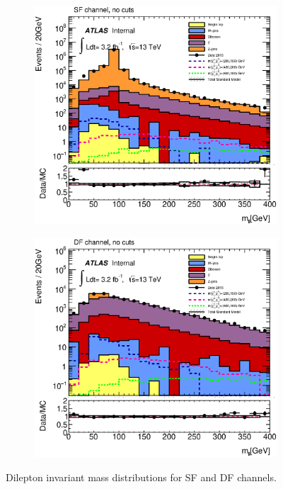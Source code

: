 \begin{figure}[!th]	   
	\begin{subfigure}[t]{0.5\textwidth}
		\subcaption{} 
		\label{fig:SF_total_mll}
        \includegraphics[scale=0.35]{Chap4/SF_DileptonMll_13TeV_total_signal} 
        \end{subfigure} 
     \begin{subfigure}[t]{0.5\textwidth}
     \subcaption{}
     	\label{fig:DF_total_mll}
        \includegraphics[scale=0.35]{Chap4/Emu_DileptonMll_13TeV_total_signal} 
        \end{subfigure}
\caption{Dilepton invariant mass distributions for SF and DF channels.}	
        \label{fig:Elmu_total_histos}
\end{figure}

